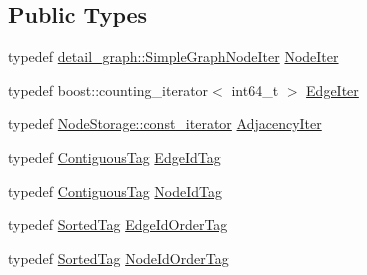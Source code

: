 \subsection*{Public Types}
\begin{DoxyCompactItemize}
\item 
typedef \hyperlink{classnifty_1_1graph_1_1detail__graph_1_1SimpleGraphNodeIter}{detail\+\_\+graph\+::\+Simple\+Graph\+Node\+Iter} \hyperlink{classnifty_1_1graph_1_1UndirectedGraph_aac54e4ad3a525489e9b29c1bd4c92c88}{Node\+Iter}
\item 
typedef boost\+::counting\+\_\+iterator$<$ int64\+\_\+t $>$ \hyperlink{classnifty_1_1graph_1_1UndirectedGraph_aa37a0dc690ad1257d5eb5105e7d66bba}{Edge\+Iter}
\item 
typedef \hyperlink{classnifty_1_1container_1_1FlatSet_a0f4cd26da060859b18742abfd534aa24}{Node\+Storage\+::const\+\_\+iterator} \hyperlink{classnifty_1_1graph_1_1UndirectedGraph_adecb4597d23d097b08c2c03a106bc57b}{Adjacency\+Iter}
\item 
typedef \hyperlink{structnifty_1_1graph_1_1ContiguousTag}{Contiguous\+Tag} \hyperlink{classnifty_1_1graph_1_1UndirectedGraph_a5e5a59e9d25ab322da5e8286cadc3e00}{Edge\+Id\+Tag}
\item 
typedef \hyperlink{structnifty_1_1graph_1_1ContiguousTag}{Contiguous\+Tag} \hyperlink{classnifty_1_1graph_1_1UndirectedGraph_a5d11b1e802f0be2f967b62f7ea5ff61e}{Node\+Id\+Tag}
\item 
typedef \hyperlink{structnifty_1_1graph_1_1SortedTag}{Sorted\+Tag} \hyperlink{classnifty_1_1graph_1_1UndirectedGraph_a2f74e8de961bf80dc037ceedf58c46a4}{Edge\+Id\+Order\+Tag}
\item 
typedef \hyperlink{structnifty_1_1graph_1_1SortedTag}{Sorted\+Tag} \hyperlink{classnifty_1_1graph_1_1UndirectedGraph_a0756fdeac9df76a32f46f2969ffacd80}{Node\+Id\+Order\+Tag}
\end{DoxyCompactItemize}
